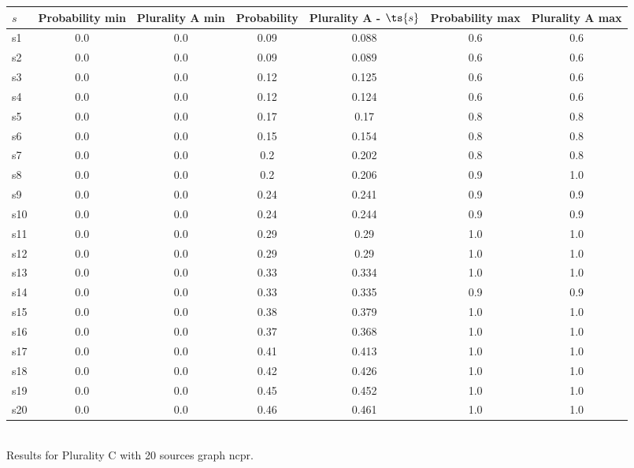 \documentclass{article}
\begin{document}
\noindent\begin{tabular}{|l|c|c|c|c|c|c|}
\hline
$s$& Probability min & Plurality A min & Probability & Plurality A - $\ts{s}$ & Probability max & Plurality A max\\
\hline
s1 &0.0 & 0.0 & 0.09 & 0.088 & 0.6 & 0.6\\
\hline
s2 &0.0 & 0.0 & 0.09 & 0.089 & 0.6 & 0.6\\
\hline
s3 &0.0 & 0.0 & 0.12 & 0.125 & 0.6 & 0.6\\
\hline
s4 &0.0 & 0.0 & 0.12 & 0.124 & 0.6 & 0.6\\
\hline
s5 &0.0 & 0.0 & 0.17 & 0.17 & 0.8 & 0.8\\
\hline
s6 &0.0 & 0.0 & 0.15 & 0.154 & 0.8 & 0.8\\
\hline
s7 &0.0 & 0.0 & 0.2 & 0.202 & 0.8 & 0.8\\
\hline
s8 &0.0 & 0.0 & 0.2 & 0.206 & 0.9 & 1.0\\
\hline
s9 &0.0 & 0.0 & 0.24 & 0.241 & 0.9 & 0.9\\
\hline
s10 &0.0 & 0.0 & 0.24 & 0.244 & 0.9 & 0.9\\
\hline
s11 &0.0 & 0.0 & 0.29 & 0.29 & 1.0 & 1.0\\
\hline
s12 &0.0 & 0.0 & 0.29 & 0.29 & 1.0 & 1.0\\
\hline
s13 &0.0 & 0.0 & 0.33 & 0.334 & 1.0 & 1.0\\
\hline
s14 &0.0 & 0.0 & 0.33 & 0.335 & 0.9 & 0.9\\
\hline
s15 &0.0 & 0.0 & 0.38 & 0.379 & 1.0 & 1.0\\
\hline
s16 &0.0 & 0.0 & 0.37 & 0.368 & 1.0 & 1.0\\
\hline
s17 &0.0 & 0.0 & 0.41 & 0.413 & 1.0 & 1.0\\
\hline
s18 &0.0 & 0.0 & 0.42 & 0.426 & 1.0 & 1.0\\
\hline
s19 &0.0 & 0.0 & 0.45 & 0.452 & 1.0 & 1.0\\
\hline
s20 &0.0 & 0.0 & 0.46 & 0.461 & 1.0 & 1.0\\
\hline
\end{tabular}\\

\noindent Results for Plurality C with 20 sources graph ncpr.
\end{document}
